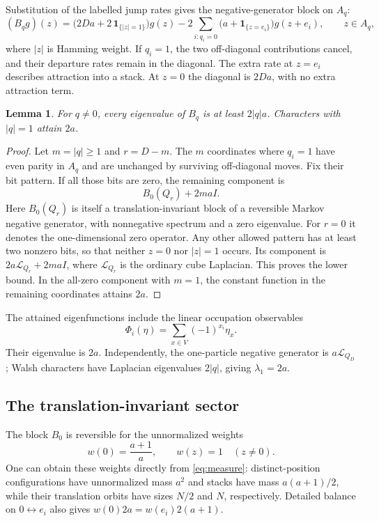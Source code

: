 \documentclass[11pt,a4paper]{article}
\newtheorem{lemma}{Lemma}
\newcommand{\ind}{\mathbf{1}}
\begin{document}
Substitution of the labelled jump rates gives the negative-generator
block on $A_q$:
\begin{equation}\label{eq:block}
 (B_q g)(z)=\bigl(2Da+2\,\ind_{\{|z|=1\}}\bigr)g(z)
 -2\sum_{i:q_i=0}\bigl(a+\ind_{\{z=e_i\}}\bigr)g(z+e_i),
 \qquad z\in A_q,
\end{equation}
where $|z|$ is Hamming weight. If $q_i=1$, the two off-diagonal
contributions cancel, and their departure rates remain in the diagonal.
The extra rate at $z=e_i$ describes attraction into a stack. At $z=0$
the diagonal is $2Da$, with no extra attraction term.

\begin{lemma}\label{lem:nonzero}
For $q\ne0$, every eigenvalue of $B_q$ is at least $2|q|a$.
Characters with $|q|=1$ attain $2a$.
\end{lemma}
\begin{proof}
Let $m=|q|\geq1$ and $r=D-m$. The $m$ coordinates where $q_i=1$
have even parity in $A_q$ and are unchanged by surviving off-diagonal
moves. Fix their bit pattern. If all those bits are zero, the remaining
component is
\begin{equation}\label{eq:components}
 B_0(Q_r)+2ma I.
\end{equation}
Here $B_0(Q_r)$ is itself a translation-invariant block of a reversible
Markov negative generator, with nonnegative spectrum and a zero
eigenvalue. For $r=0$ it denotes the one-dimensional zero operator.
Any other allowed pattern has at least two nonzero bits, so that neither
$z=0$ nor $|z|=1$ occurs. Its component is
$2a\mathcal L_{Q_r}+2ma I$, where $\mathcal L_{Q_r}$ is the ordinary
cube Laplacian. This proves the lower bound. In the all-zero component
with $m=1$, the constant function in the remaining coordinates attains
$2a$.
\end{proof}

The attained eigenfunctions include the linear occupation observables
\begin{equation}\label{eq:linear}
 \Phi_i(\eta)=\sum_{x\in V}(-1)^{x_i}\eta_x.
\end{equation}
Their eigenvalue is $2a$. Independently, the one-particle negative
generator is $a\mathcal L_{Q_D}$; Walsh characters have Laplacian
eigenvalues $2|q|$, giving $\lambda_1=2a$.

\subsection{The translation-invariant sector}
The block $B_0$ is reversible for the unnormalized weights
\begin{equation}\label{eq:relative-weights}
 w(0)=\frac{a+1}{a},\qquad w(z)=1\quad(z\ne0).
\end{equation}
One can obtain these weights directly from \eqref{eq:measure}:
distinct-position configurations have unnormalized mass $a^2$ and stacks
have mass $a(a+1)/2$, while their translation orbits have sizes $N/2$
and $N$, respectively. Detailed balance on $0\leftrightarrow e_i$
also gives $w(0)2a=w(e_i)2(a+1)$.
\end{document}
